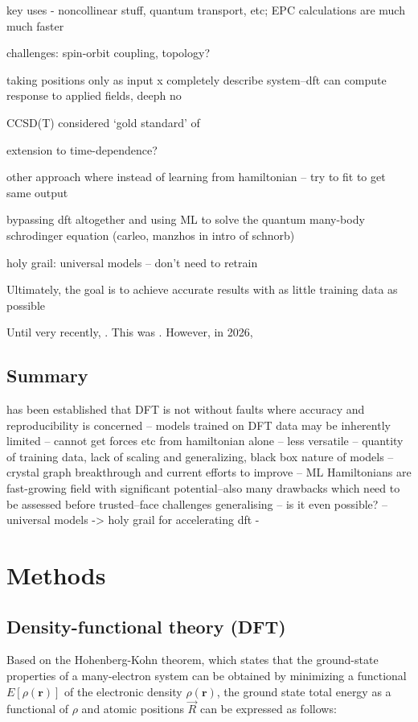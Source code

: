 \documentclass[11pt,a4paper,twoside]{report}  %
\numberwithin{equation}{section}					%
\numberwithin{figure}{section}						%
\newcommand{\red}[1]{{\color{red}#1}}
\begin{document}
\red{key uses - noncollinear stuff, quantum transport, etc; EPC calculations are much much faster}

\red{challenges: spin-orbit coupling, topology?}

\red{taking positions only as input x completely describe system--dft can compute response to applied fields, deeph no}

CCSD(T) considered `gold standard' of 

\red{extension to time-dependence?}

\red{other approach where instead of learning from hamiltonian -- try to fit to get same output}

bypassing dft altogether and using ML to solve the quantum many-body schrodinger equation (carleo, manzhos in intro of schnorb)

holy grail: universal models -- don't need to retrain

Ultimately, the goal is to achieve accurate results with as little training data as possible


Until very recently, . This was . However, in 2026, 

\section{Summary}


has been established that DFT is not without faults where accuracy and reproducibility is concerned -- models trained on DFT data may be inherently limited -- cannot get forces etc from hamiltonian alone -- less versatile -- quantity of training data, lack of scaling and generalizing, black box nature of models -- crystal graph breakthrough and current efforts to improve -- ML Hamiltonians are fast-growing field with significant potential--also many drawbacks which need to be assessed before trusted--face challenges generalising -- is it even possible? -- universal models -> holy grail for accelerating dft - 


\chapter{Methods}

\section{Density-functional theory (DFT)}

Based on the Hohenberg-Kohn theorem, which states that the ground-state properties of a many-electron system can be obtained by minimizing a functional $E[\rho(\mathbf r)]$ of the electronic density $\rho(\mathbf r)$, the ground state total energy as a functional of $\rho$ and atomic positions $\vec R$ can be expressed as follows\autocites{hohenbergInhomogeneousElectronGas1964}:
\end{document}
